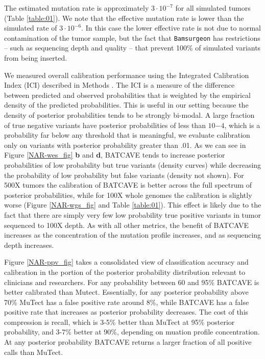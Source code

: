 \documentclass[a4,center,fleqn]{NAR}
\newcommand{\batcave}{BATCAVE }
\begin{document}
The estimated mutation rate is approximately $3\cdot10^{-7}$ for all simulated tumors (Table \ref{table:01}).
We note that the effective mutation rate is lower than the simulated rate of $3\cdot10^{-6}$.
In this case the lower effective rate is not due to normal contamination of the tumor sample, but the fact that \texttt{Bamsurgeon} has restrictions -- such as sequencing depth and quality -- that prevent 100\% of simulated variants from being inserted. 

We measured overall calibration performance using the Integrated Calibration Index (ICI) described in Methods \citep{Austin2019}.
The ICI is a measure of the difference between predicted and observed probabilities that is weighted by the empirical density of the predicted probabilities.
This is useful in our setting because the density of posterior probabilities tends to be strongly bi-modal.
A large fraction of true negative variants have posterior probabilities of less than $10{-4}$, which is a probability far below any threshold that is meaningful, we evaluate calibration only on variants with posterior probability greater than .01.
As we can see in Figure \ref{NAR-wes_fig} \textbf{b} and \textbf{d}, \batcave tends to increase posterior probabilities of low probability but true variants (density curves) while decreasing the probability of low probability but false variants (density not shown).
For 500X tumors the calibration of \batcave is better across the full spectrum of posterior probabilities, while for 100X whole genomes the calibration is slightly worse (Figure \ref{NAR-wgs_fig} and Table \ref{table:01}).
This effect is likely due to the fact that there are simply very few low probability true positive variants in tumor sequenced to 100X depth.
As with all other metrics, the benefit of \batcave increases as the concentration of the mutation profile increases, and as sequencing depth increases.

Figure \ref{NAR-ppv_fig} takes a consolidated view of classification accuracy and calibration in the portion of the posterior probability distribution relevant to clinicians and researchers.
For any probability between 60 and 95\% \batcave is better calibrated than Mutect.
Essentially, for any posterior probability above 70\% MuTect has a false positive rate around 8\%, while \batcave has a false positive rate that increases as posterior probability decreases.
The cost of this compression is recall, which is 3-5\% better than MuTect at 95\% posterior probability, and 3-7\% better at 90\%, depending on muation profile concentration.
At any posterior probability \batcave returns a larger fraction of all positive calls than MuTect.
\end{document}
